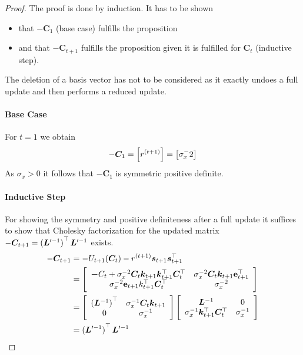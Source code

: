 \documentclass[11pt,a4paper,twoside,BCOR=15mm]{scrbook}
\newcommand{\vc}[1]{\bm{#1}}
\newcommand{\mat}[1]{\bm{#1}}
\newcommand{\Tr}{^{\top}}
\newcommand{\e}{\mathrm{e}}
\begin{document}
\begin{proof}
    The proof is done by induction. It has to be shown
    \begin{itemize}
        \item that $-\mat C_1$ (base case) fulfills the proposition
        \item and that $-\mat C_{t+1}$ fulfills the proposition given it is 
            fulfilled for $\mat C_t$ (inductive step).
    \end{itemize}
    The deletion of a basis vector has not to be considered as it exactly undoes 
    a full update and then performs a reduced update.

    \paragraph{Base Case}
    For $t = 1$ we obtain
    \begin{equation*}
        -\mat C_1 = \sbr{r^{(t+1)}} = \sbr{\sigma_x^-2}
    \end{equation*}
    As $\sigma_x > 0$ it follows that $-\mat C_1$ is symmetric positive 
    definite.

    \paragraph{Inductive Step}
    For showing the symmetry and positive definiteness after a full update it 
    suffices to show that Cholesky factorization for the updated matrix $-\mat 
    C_{t+1} = \del[0]{\mat L'^{-1}}\Tr \mat L'^{-1}$ exists.
\begin{align*}
        -\mat C_{t+1} &= -U_{t+1}(\mat C_t) - r^{(t+1)} \vc s_{t+1} \vc 
        s_{t+1}\Tr \\
        &= \sbr{\begin{array}{cc}
                \mat -C_t + \sigma_x^{-2} \mat C_t \vc k_{t+1} \vc k_{t+1}\Tr 
                \mat C_t\Tr & \sigma_x^{-2} \mat C_t \vc k_{t+1} \vc\e_{t+1}\Tr 
                \\
                \sigma_x^{-2} \vc\e_{t+1} k_{t+1}\Tr \mat C_t\Tr & \sigma_x^{-2}
            \end{array}} \\
        &= \sbr{\begin{array}{cc}
                \del[0]{\mat L^{-1}}\Tr & \sigma_x^{-1} \mat C_t \vc k_{t+1} \\
                0 & \sigma_x^{-1}
            \end{array}} \sbr{\begin{array}{cc}
                \mat L^{-1} & 0 \\
                \sigma_x^{-1} \vc k_{t+1}\Tr \mat C_t\Tr & \sigma_x^{-1}
            \end{array}} \\
        &= \del[0]{\mat L'^{-1}}\Tr \mat L'^{-1}
    \end{align*}


\end{proof}
\end{document}

